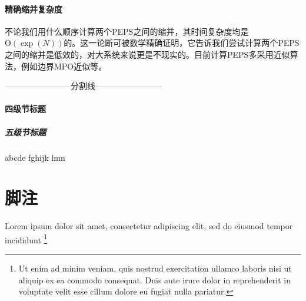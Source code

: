 \paragraph{精确缩并复杂度}

不论我们用什么顺序计算两个PEPS之间的缩并，其时间复杂度均是$\mathrm{O}\left(\exp(N)\right)$的\cite[139]{PracticalIntroductionTensor2014}。这一论断可被数学精确证明，它告诉我们尝试计算两个PEPS之间的缩并是低效的，对大系统来说更是不现实的。目前计算PEPS多采用近似算法，例如边界MPO近似\cite{lubaschUnifyingProjectedEntangled2014}等。


------------------------分割线------------------------
\paragraph{四级节标题}

\subparagraph{五级节标题}

abcde fghijk lmn

\section{脚注}

Lorem ipsum dolor sit amet, consectetur adipiscing elit, sed do eiusmod tempor
incididunt 
\footnote{Ut enim ad minim veniam, quis nostrud exercitation ullamco laboris
  nisi ut aliquip ex ea commodo consequat.
  Duis aute irure dolor in reprehenderit in voluptate velit esse cillum dolore
  eu fugiat nulla pariatur.}
